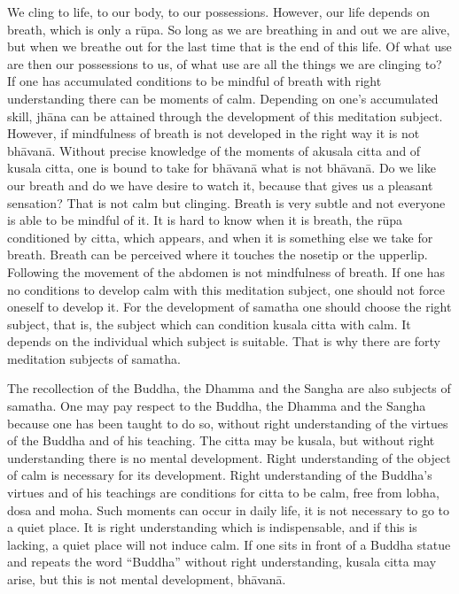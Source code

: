 We cling to life, to our body, to our possessions. However, our life
depends on breath, which is only a rūpa. So long as we are breathing in
and out we are alive, but when we breathe out for the last time that is
the end of this life. Of what use are then our possessions to us, of
what use are all the things we are clinging to? If one has accumulated
conditions to be mindful of breath with right understanding there can be
moments of calm. Depending on one's accumulated skill, jhāna can be
attained through the development of this meditation subject. However, if
mindfulness of breath is not developed in the right way it is not
bhāvanā. Without precise knowledge of the moments of akusala citta and
of kusala citta, one is bound to take for bhāvanā what is not bhāvanā.
Do we like our breath and do we have desire to watch it, because that
gives us a pleasant sensation? That is not calm but clinging. Breath is
very subtle and not everyone is able to be mindful of it. It is hard to
know when it is breath, the rūpa conditioned by citta, which appears,
and when it is something else we take for breath. Breath can be
perceived where it touches the nosetip or the upperlip. Following the
movement of the abdomen is not mindfulness of breath. If one has no
conditions to develop calm with this meditation subject, one should not
force oneself to develop it. For the development of samatha one should
choose the right subject, that is, the subject which can condition
kusala citta with calm. It depends on the individual which subject is
suitable. That is why there are forty meditation subjects of samatha.

The recollection of the Buddha, the Dhamma and the Sangha are also
subjects of samatha. One may pay respect to the Buddha, the Dhamma and
the Sangha because one has been taught to do so, without right
understanding of the virtues of the Buddha and of his teaching. The
citta may be kusala, but without right understanding there is no mental
development. Right understanding of the object of calm is necessary for
its development. Right understanding of the Buddha's virtues and of his
teachings are conditions for citta to be calm, free from lobha, dosa and
moha. Such moments can occur in daily life, it is not necessary to go to
a quiet place. It is right understanding which is indispensable, and if
this is lacking, a quiet place will not induce calm. If one sits in
front of a Buddha statue and repeats the word ``Buddha'' without right
understanding, kusala citta may arise, but this is not mental
development, bhāvanā.

